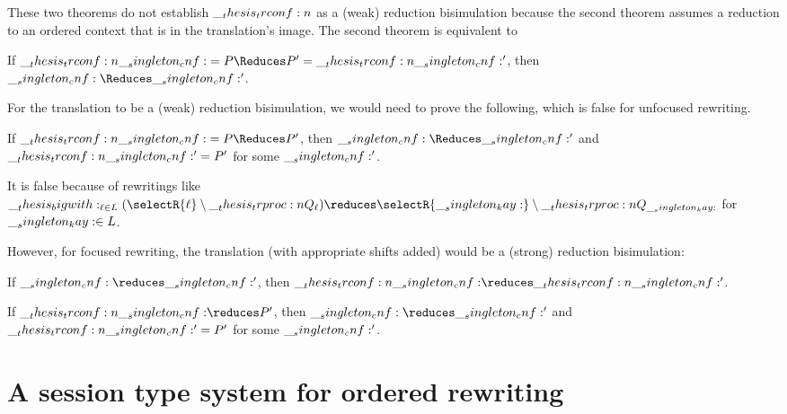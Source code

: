 These two theorems do not establish $\__thesis_trconf:n {}$ as a (weak) reduction bisimulation because the second theorem assumes a reduction to an ordered context that is in the translation's image.
The second theorem is equivalent to 
\begin{theorem}
  If $\trconf{\cnf} = P \Reduces P' = \trconf{\cnf'}$, then $\cnf \Reduces \cnf'$.
\end{theorem}
For the translation to be a (weak) reduction bisimulation, we would need to prove the following, which is false for unfocused rewriting.
\begin{falseclaim}
  If $\trconf{\cnf} = P \Reduces P'$, then $\cnf \Reduces \cnf'$ and $\__thesis_trconf:n {\__singleton_cnf:'} = P'$ for some $\__singleton_cnf:'$.
\end{falseclaim}
It is false because of rewritings like $\bigwith_{\ell \in L} (\selectR{\ell} \limp \trproc{Q_{\ell}}) \reduces \selectR{\kay} \limp \trproc{Q_{\kay}}$ for $\__singleton_kay: \in L$.

However, for focused rewriting, the translation (with appropriate shifts added) would be a (strong) reduction bisimulation:
\begin{theorem}
  If $\cnf \reduces \cnf'$, then $\trconf{\cnf} \reduces \trconf{\cnf'}$.
\end{theorem}
%
\begin{theorem}
  If $\trconf{\cnf} \reduces P'$, then $\cnf \reduces \cnf'$ and $\__thesis_trconf:n {\__singleton_cnf:'} = P'$ for some $\__singleton_cnf:'$.
\end{theorem}


\section{A session type system for ordered rewriting}



